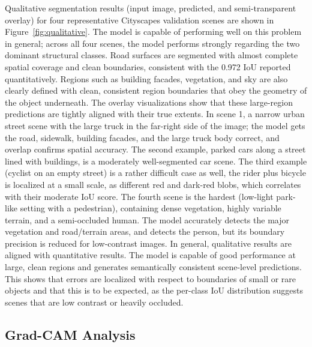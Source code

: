 \documentclass[conference]{IEEEtran}
\begin{document}
Qualitative segmentation results (input image, predicted, and semi-transparent overlay) for four
representative Cityscapes validation scenes are shown in Figure~\ref{fig:qualitative}. The model is capable of performing
well on this problem in general; across all four scenes, the model performs strongly regarding the two
dominant structural classes. Road surfaces are segmented with almost complete spatial coverage and clean
boundaries, consistent with the 0.972 IoU reported quantitatively. Regions such as building facades,
vegetation, and sky are also clearly defined with clean, consistent region boundaries that obey the
geometry of the object underneath. The overlay visualizations show that these large-region predictions are
tightly aligned with their true extents. In scene 1, a narrow urban street scene with the large truck in the
far-right side of the image; the model gets the road, sidewalk, building facades, and the large truck body
correct, and overlap confirms spatial accuracy. The second example, parked cars along a street lined with
buildings, is a moderately well-segmented car scene. The third example (cyclist on an empty street) is a
rather difficult case as well, the rider plus bicycle is localized at a small scale, as different red and dark-red blobs, which correlates with their moderate IoU score. The fourth scene is the hardest (low-light park-like setting with a pedestrian), containing dense vegetation, highly variable terrain, and a semi-occluded
human. The model accurately detects the major vegetation and road/terrain areas, and detects the person,
but its boundary precision is reduced for low-contrast images. In general, qualitative results are aligned
with quantitative results. The model is capable of good performance at large, clean regions and generates
semantically consistent scene-level predictions. This shows that errors are localized with respect to
boundaries of small or rare objects and that this is to be expected, as the per-class IoU distribution suggests
scenes that are low contrast or heavily occluded.



\subsection{Grad-CAM Analysis}\label{subsec:gradcam}
\end{document}
